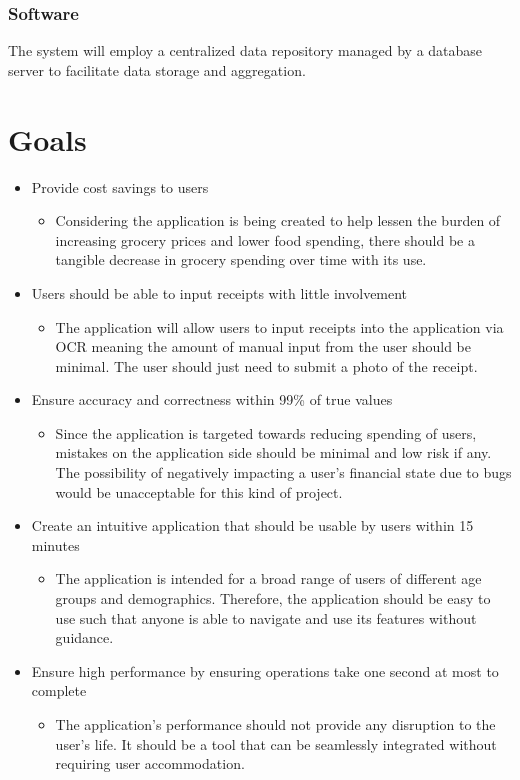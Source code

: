 \documentclass{article}
\begin{document}
\subsubsection{Software}
The system will employ a centralized data repository managed by a database server to facilitate data storage and aggregation.

\section{Goals}

\begin{itemize}
  \item Provide cost savings to users
  \begin{itemize}
    \item Considering the application is being created to help lessen the burden of increasing
    grocery prices and lower food spending, there should be a tangible decrease in grocery spending
    over time with its use.
  \end{itemize}
  \item Users should be able to input receipts with little involvement
  \begin{itemize}
    \item The application will allow users to input receipts into the application via OCR
    meaning the amount of manual input from the user should be minimal. The user should just need
    to submit a photo of the receipt.
  \end{itemize}
  \item Ensure accuracy and correctness within 99\% of true values
  \begin{itemize}
    \item Since the application is targeted towards reducing spending of users, mistakes
    on the application side should be minimal and low risk if any. The possibility of negatively
    impacting a user's financial state due to bugs would be unacceptable for this kind of
    project.
  \end{itemize}  
  \item Create an intuitive application that should be usable by users within 15 minutes
  \begin{itemize}
    \item The application is intended for a broad range of users of different age groups
    and demographics. Therefore, the application should be easy to use such that anyone
    is able to navigate and use its features without guidance.
  \end{itemize}  
  \item Ensure high performance by ensuring operations take one second at most to complete
  \begin{itemize}
    \item The application's performance should not provide any disruption to the user's life.
    It should be a tool that  can be seamlessly integrated without requiring user
    accommodation.
  \end{itemize} 
\end{itemize}
\end{document}
